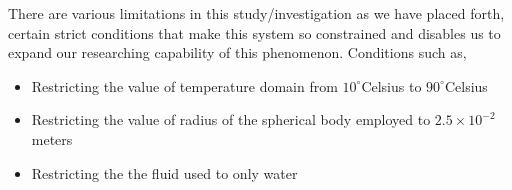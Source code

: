 {There are various limitations in this study/investigation as we have placed forth, certain strict conditions that make this system so constrained and disables us to expand our researching capability of this phenomenon. Conditions such as,}
        
    \begin{itemize}
        \item {Restricting the value of temperature domain from $10^\circ$Celsius to $90^\circ$Celsius}
        \item {Restricting the value of radius of the spherical body employed to $2.5\times10^{-2}$ meters}
        \item {Restricting the the fluid used to only water}
    \end{itemize}
        
        

